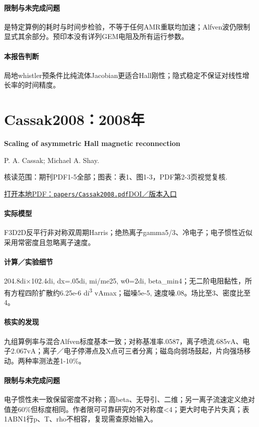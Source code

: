 \paragraph{限制与未完成问题}是特定算例的耗时与时间步检验，不等于任何AMR重联均加速；Alfven波仍限制显式其余部分。预印本没有详列GEM电阻及所有运行参数。

\paragraph{本报告判断}局地whistler预条件比纯流体Jacobian更适合Hall刚性；隐式稳定不保证对线性增长率的时间精度。

\section{Cassak2008：2008年}\label{paper:Cassak2008}

\textbf{Scaling of asymmetric Hall magnetic reconnection}\citep{Cassak2008}\

P. A. Cassak;  Michael A. Shay.

\textsf{核读范围：}期刊PDF1-5全部；\textsf{图表：}表1、图1-3，PDF第2-3页视觉复核.

\href{run:papers/Cassak2008.pdf}{打开本地PDF：\texttt{papers/Cassak2008.pdf}}\quad\href{https://doi.org/10.1029/2008gl035268}{DOI／版本入口}

\paragraph{实际模型}F3D2D反平行非对称双周期Harris；绝热离子gamma5/3、冷电子；电子惯性近似采用常密度且忽略离子速度。

\paragraph{计算／实验细节}204.8di×102.4di, dx=.05di, mi/me25, w0=2di, beta\_min4；无二阶电阻黏性，所有方程四阶扩散约6.25e-6 di\textsuperscript{3} vAmax；磁噪5e-5, 速度噪.08。场比至3、密度比至4。

\paragraph{核实的发现}九组算例率与混合Alfven标度基本一致；对称基准率.0587，离子喷流.685vA、电子2.067vA；离子／电子停滞点及X点可三者分离；磁岛向弱场鼓起，片向强场移动。两种率测法差1-10\%。

\paragraph{限制与未完成问题}电子惯性未一致保留密度不对称；高beta、无导引、二维；另一离子流速定义绝对值差60\%但标度相同。作者限可可靠研究的不对称度<4；更大时电子片失真；表1ABN1行p、T、rho不相容，复现需查原始输入。

